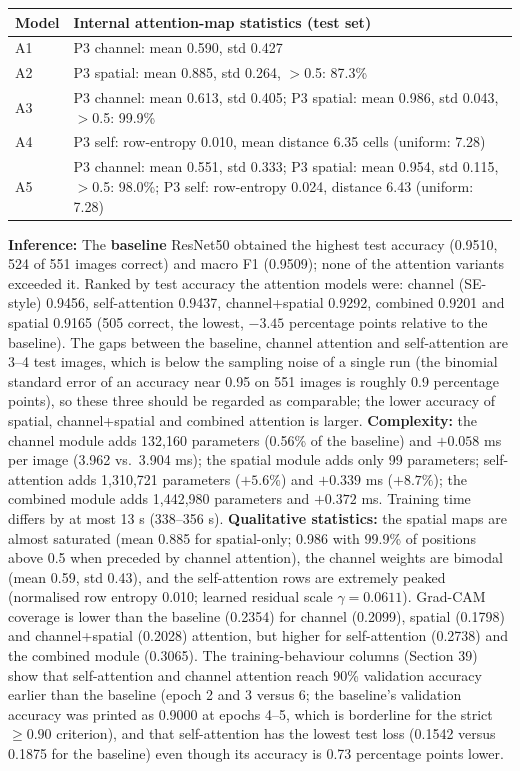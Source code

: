 \documentclass[10pt]{article}
\begin{document}
\begin{center}
\small
\begin{tabular}{|l|p{12cm}|}
\hline
\textbf{Model} & \textbf{Internal attention-map statistics (test set)} \\
\hline
A1 & P3 channel: mean 0.590, std 0.427 \\
\hline
A2 & P3 spatial: mean 0.885, std 0.264, $>$0.5: 87.3\% \\
\hline
A3 & P3 channel: mean 0.613, std 0.405; P3 spatial: mean 0.986, std 0.043, $>$0.5: 99.9\% \\
\hline
A4 & P3 self: row-entropy 0.010, mean distance 6.35 cells (uniform: 7.28) \\
\hline
A5 & P3 channel: mean 0.551, std 0.333; P3 spatial: mean 0.954, std 0.115, $>$0.5: 98.0\%; P3 self: row-entropy 0.024, distance 6.43 (uniform: 7.28) \\
\hline
\end{tabular}
\end{center}

\textbf{Inference:} The \textbf{baseline} ResNet50 obtained the highest test accuracy (0.9510, 524 of 551 images correct) and
macro F1 (0.9509); none of the attention variants exceeded it. Ranked by test accuracy the attention
models were: channel (SE-style) 0.9456, self-attention 0.9437, channel+spatial 0.9292, combined 0.9201 and
spatial 0.9165 (505 correct, the lowest, $-3.45$ percentage points relative to the baseline). The gaps between the baseline,
channel attention and self-attention are 3--4 test images, which is below the sampling noise of a single run (the
binomial standard error of an accuracy near 0.95 on 551 images is roughly 0.9 percentage points), so these three
should be regarded as comparable; the lower accuracy of spatial, channel+spatial and combined attention is larger.
\textbf{Complexity:} the channel module adds 132{,}160 parameters (0.56\% of the baseline) and
$+0.058$ ms per image (3.962 vs.\ 3.904 ms); the spatial module adds only 99 parameters; self-attention adds
1{,}310{,}721 parameters ($+5.6\%$) and $+0.339$ ms ($+8.7\%$); the combined module adds 1{,}442{,}980 parameters and
$+0.372$ ms. Training time differs by at most 13 s (338--356 s).
\textbf{Qualitative statistics:} the spatial maps are almost saturated (mean 0.885 for spatial-only; 0.986 with 99.9\% of
positions above 0.5 when preceded by channel attention), the channel weights are bimodal (mean 0.59, std 0.43), and the
self-attention rows are extremely peaked (normalised row entropy 0.010; learned residual scale $\gamma=0.0611$).
Grad-CAM coverage is lower than the baseline (0.2354) for channel (0.2099), spatial (0.1798) and channel+spatial (0.2028)
attention, but higher for self-attention (0.2738) and the combined module (0.3065).
The training-behaviour columns (Section 39) show that self-attention and channel attention reach 90\% validation accuracy earlier
than the baseline (epoch 2 and 3 versus 6; the baseline's validation accuracy was printed as 0.9000 at epochs 4--5, which is borderline for the
strict $\ge0.90$ criterion), and that self-attention has the lowest test loss (0.1542 versus 0.1875 for the baseline) even though its
accuracy is 0.73 percentage points lower.
\end{document}
